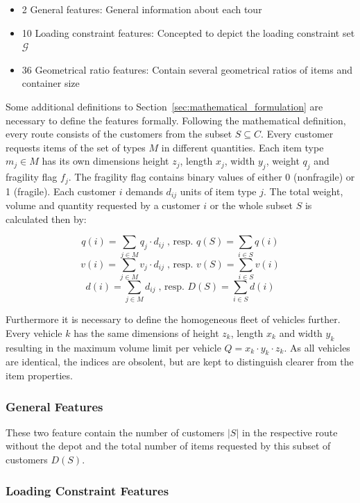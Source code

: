 \begin{itemize}
    \item 2 General features: General information about each tour
    \item 10 Loading constraint features: Concepted to depict the loading constraint set $\mathcal{G}$
    \item 36 Geometrical ratio features: Contain several geometrical ratios of items and container size
\end{itemize}

Some additional definitions to Section~\ref{sec:mathematical_formulation}
are necessary to define the features formally. Following the mathematical definition, every route consists of the customers
from the subset $S \subseteq C$. Every customer requests items of the set of types $M$ in different quantities.
Each item type $m_j\in M$ has its own dimensions height $z_j$, length $x_j$, width $y_j$, weight $q_j$ and fragility flag $f_j$.
The fragility flag contains binary values of either 0 (nonfragile) or 1 (fragile).
Each customer $i$ demands $d_{ij}$ units of item type $j$.
The total weight, volume and quantity requested by a customer $i$ or the whole subset $S$ is calculated then by:

\[q(i) = \sum_{j \in M} q_j \cdot d_{ij}\;\text{, resp. } q(S) = \sum_{i\in S} q(i)\]
\[v(i) = \sum_{j \in M} v_j \cdot d_{ij}\;\text{, resp. } v(S) = \sum_{i\in S} v(i)\]
\[d(i) = \sum_{j \in M} d_{ij}\;\text{, resp. } D(S) = \sum_{i\in S} d(i)\]

Furthermore it is necessary to define the homogeneous fleet of vehicles
further. Every vehicle $k$ has the same dimensions of height $z_k$, length $x_k$ and width $y_k$ resulting in the maximum volume limit per
vehicle $Q = x_k \cdot y_k\cdot z_k$. As all vehicles are identical, the indices are obsolent, but are kept to distinguish clearer
from the item properties.

\subsubsection{General Features}
These two feature contain the number of customers $|S|$ in the respective route without the depot and the total number of items requested by
this subset of customers $D(S)$.

\subsubsection{Loading Constraint Features}

